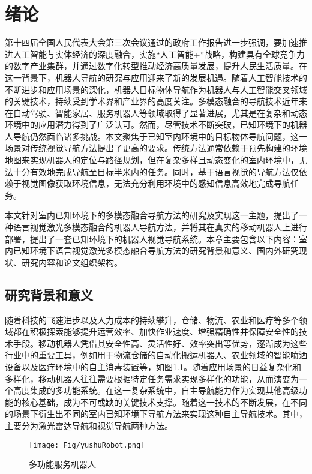 \chapter{绪论}
%
	第十四届全国人民代表大会第三次会议通过的政府工作报告进一步强调，要加速推进人工智能与实体经济的深度融合，实施“人工智能+”战略，构建具有全球竞争力的数字产业集群，并通过数字化转型推动经济高质量发展，提升人民生活质量\cite{China2025}。在这一背景下，机器人导航的研究与应用迎来了新的发展机遇。随着人工智能技术的不断进步和应用场景的深化，机器人目标物体导航\cite{zhang2022survey}作为机器人与人工智能交叉领域的关键技术，持续受到学术界和产业界的高度关注。多模态融合的导航技术近年来在自动驾驶、智能家居、服务机器人等领域取得了显著进展\cite{majumdar2022zson}，尤其是在复杂和动态环境中的应用潜力得到了广泛认可。然而，尽管技术不断突破，已知环境下的机器人导航仍然面临诸多挑战。本文聚焦于已知室内环境中的目标物体导航问题\cite{sun2024survey}，这一场景对传统视觉导航方法提出了更高的要求。传统方法通常依赖于预先构建的环境地图来实现机器人的定位与路径规划，但在复杂多样且动态变化的室内环境中，无法十分有效地完成导航至目标半米内的任务\cite{mavrogiannis2023core}。同时，基于语言视觉的导航方法仅依赖于视觉图像获取环境信息，无法充分利用环境中的感知信息高效地完成导航任务\cite{li2023reinforcement}。

	本文针对室内已知环境下的多模态融合导航方法的研究及实现这一主题，提出了一种语言视觉激光多模态融合的机器人导航方法，并将其在真实的移动机器人上进行部署，提出了一套已知环境下的机器人视觉导航系统。本章主要包含以下内容：室内已知环境下语言视觉激光多模态融合导航方法的研究背景和意义、国内外研究现状、研究内容和论文组织架构。

\section{研究背景和意义}
	随着科技的飞速进步以及人力成本的持续攀升，仓储、物流、农业和医疗等多个领域都在积极探索能够提升运营效率、加快作业速度、增强精确性并保障安全性的技术手段。移动机器人凭借其安全性高、灵活性好、效率突出等优势，逐渐成为这些行业中的重要工具\cite{reddy2023advancements}，例如用于物流仓储的自动化搬运机器人、农业领域的智能喷洒设备以及医疗环境中的自主消毒装置等，如图\ref{serverrobot}。随着应用场景的日益复杂化和多样化，移动机器人往往需要根据特定任务需求实现多样化的功能，从而演变为一个高度集成的多功能系统。在这一复杂系统中，自主导航能力作为实现其他高级功能的核心基础，成为不可或缺的关键技术支撑。随着这一技术的不断发展，在不同的场景下衍生出不同的室内已知环境下导航方法来实现这种自主导航技术。其中，主要分为激光雷达导航\cite{zhang2014loam}和视觉导航\cite{kazerouni2022survey}两种方法。
	\begin{figure}[htbp]
		\centering
		\texttt{[image: Fig/yushuRobot.png]}
		\caption{\label{serverrobot}多功能服务机器人}
	\end{figure}

